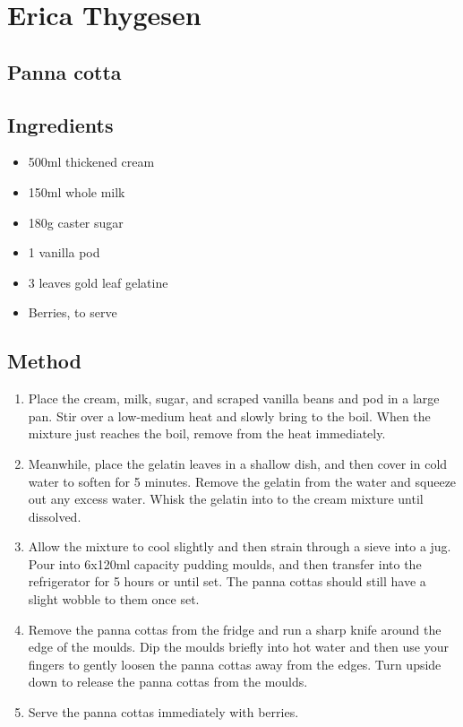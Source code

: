 \section{Erica Thygesen}

\subsection{Panna cotta}

\subsection{Ingredients}
\begin{itemize}
        \item 500ml thickened cream
        \item 150ml whole milk
        \item 180g caster sugar
	\item 1 vanilla pod
	\item 3 leaves gold leaf gelatine
	\item Berries, to serve
\end{itemize}

\subsection{Method}

\begin{enumerate}
\item Place the cream, milk, sugar, and scraped vanilla beans and pod in a large pan. Stir over a low-medium heat and slowly bring to the boil. When the mixture just reaches the boil, remove from the heat immediately.
\item Meanwhile, place the gelatin leaves in a shallow dish, and then cover in cold water to soften for 5 minutes. Remove the gelatin from the water and squeeze out any excess water. Whisk the gelatin into to the cream mixture until dissolved.
\item Allow the mixture to cool slightly and then strain through a sieve into a jug. Pour into 6x120ml capacity pudding moulds, and then transfer into the refrigerator for 5 hours or until set. The panna cottas should still have a slight wobble to them once set.
\item Remove the panna cottas from the fridge and run a sharp knife around the edge of the moulds. Dip the moulds briefly into hot water and then use your fingers to gently loosen the panna cottas away from the edges. Turn upside down to release the panna cottas from the moulds.
\item Serve the panna cottas immediately with berries. 
\end{enumerate}

